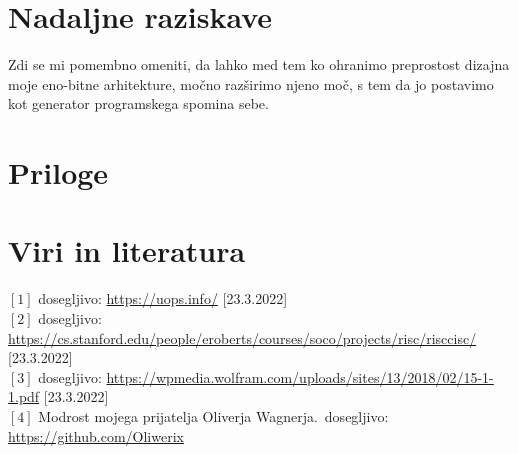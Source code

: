\documentclass[12pt]{article}
\begin{document}
\section{Nadaljne raziskave}
Zdi se mi pomembno omeniti, da lahko med tem ko ohranimo preprostost dizajna moje eno-bitne arhitekture, močno razširimo njeno moč, s tem da jo postavimo kot generator programskega spomina sebe.

\section{Priloge}

\lstset{
  basicstyle=\footnotesize,
  breaklines=true,
  frame=single,
  stepnumber=5,
}









%






\pagebreak
\section{Viri in literatura}
$[1]$ dosegljivo: \url{https://uops.info/} [23.3.2022]\\
$[2]$ dosegljivo: \url{https://cs.stanford.edu/people/eroberts/courses/soco/projects/risc/risccisc/} [23.3.2022]\\
$[3]$ dosegljivo: \url{https://wpmedia.wolfram.com/uploads/sites/13/2018/02/15-1-1.pdf} [23.3.2022]\\
$[4]$ Modrost mojega prijatelja Oliverja Wagnerja.\ dosegljivo: \url{https://github.com/Oliwerix}\\

\end{document}
